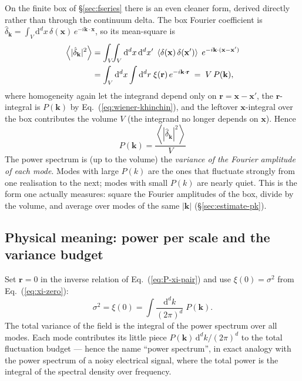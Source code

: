 \documentclass[12pt]{article}
\newcommand{\bk}{\mathbf{k}}
\newcommand{\bx}{\mathbf{x}}
\newcommand{\br}{\mathbf{r}}
\newcommand{\avg}[1]{\left\langle #1 \right\rangle}
\begin{document}
On the finite box of \S\ref{sec:fseries} there is an even cleaner form,
derived directly rather than through the continuum delta.  The box
Fourier coefficient is $\hat\delta_\bk = \int_V \mathrm d^d x\,
\delta(\bx)\,e^{-i\bk\cdot\bx}$, so its mean-square is
\begin{align}
  \avg{|\hat\delta_\bk|^2}
  &= \int_V\!\!\int_V \mathrm d^d x\,\mathrm d^d x'\;
     \avg{\delta(\bx)\,\delta(\bx')}\;e^{-i\bk\cdot(\bx-\bx')} \notag\\
  &= \int_V \mathrm d^d x \int \mathrm d^d r\;\xi(\br)\,e^{-i\bk\cdot\br}
   \;=\; V\,P(\bk),
  \label{eq:pk-box-deriv}
\end{align}
where homogeneity again let the integrand depend only on
$\br = \bx - \bx'$, the $\br$-integral is $P(\bk)$ by
Eq.~(\ref{eq:wiener-khinchin}), and the leftover $\bx$-integral over the
box contributes the volume $V$ (the integrand no longer depends on
$\bx$).  Hence
\begin{equation}
  \boxed{\;P(\bk) = \frac{\avg{|\hat\delta_\bk|^2}}{V}\;}
  \label{eq:pk-var}
\end{equation}
The power spectrum is (up to the volume) the \emph{variance of the
Fourier amplitude of each mode}.  Modes with large $P(k)$ are the ones
that fluctuate strongly from one realisation to the next; modes with
small $P(k)$ are nearly quiet.  This is the form one actually measures:
square the Fourier amplitudes of the box, divide by the volume, and
average over modes of the same $|\bk|$ (\S\ref{sec:estimate-pk}).

\subsection{Physical meaning: power per scale and the variance budget}
\label{sec:pk-physical}

Set $\br = 0$ in the inverse relation of Eq.~(\ref{eq:P-xi-pair}) and use
$\xi(0) = \sigma^2$ from Eq.~(\ref{eq:xi-zero}):
\begin{equation}
  \sigma^2 = \xi(0) = \int \frac{\mathrm d^d k}{(2\pi)^d}\;P(\bk).
  \label{eq:sigma-integral}
\end{equation}
The total variance of the field is the integral of the power spectrum
over all modes.  Each mode contributes its little piece $P(\bk)\,\mathrm
d^d k/(2\pi)^d$ to the total fluctuation budget --- hence the name
``power spectrum'', in exact analogy with the power spectrum of a noisy
electrical signal, where the total power is the integral of the spectral
density over frequency.
\end{document}
